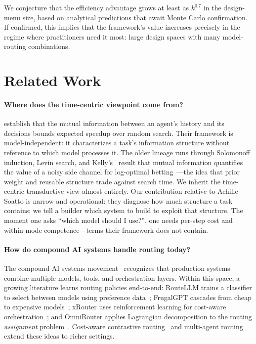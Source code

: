\documentclass[twoside,11pt]{article}
\begin{document}
We conjecture that the efficiency advantage grows at least as $k^{0.7}$ in the design-menu size, based on analytical predictions that await Monte Carlo confirmation.
If confirmed, this implies that the framework's value increases precisely in the regime where practitioners need it most: large design spaces with many model-routing combinations.

\section{Related Work}
\label{sec:related}

\paragraph{Where does the time-centric viewpoint come from?}
\citet{achille2025agents} establish that the mutual information between an agent's history and its decisions bounds expected speedup over random search.
Their framework is model-independent: it characterizes a task's information structure without reference to which model processes it.
The older lineage runs through Solomonoff induction, Levin search, and Kelly's~\citeyearpar{kelly1956new} result that mutual information quantifies the value of a noisy side channel for log-optimal betting~\citep{cover2006elements}---the idea that prior weight and reusable structure trade against search time.
We inherit the time-centric transductive view almost entirely.
Our contribution relative to Achille--Soatto is narrow and operational: they diagnose how much structure a task contains; we tell a builder which system to build to exploit that structure.
The moment one asks ``which model should I use?'', one needs per-step cost and within-mode competence---terms their framework does not contain.

\paragraph{How do compound AI systems handle routing today?}
The compound AI systems movement~\citep{zaharia2024compound,wen2025compound} recognizes that production systems combine multiple models, tools, and orchestration layers.
Within this space, a growing literature learns routing policies end-to-end: RouteLLM trains a classifier to select between models using preference data~\citep{ong2024routellm}; FrugalGPT cascades from cheap to expensive models~\citep{chen2023frugalgpt}; xRouter uses reinforcement learning for cost-aware orchestration~\citep{xrouter2024}; and OmniRouter applies Lagrangian decomposition to the routing \emph{assignment} problem~\citep{omnirouter2025}.
Cost-aware contrastive routing~\citep{cscr2025} and multi-agent routing~\citep{masrouter2025} extend these ideas to richer settings.
\end{document}

